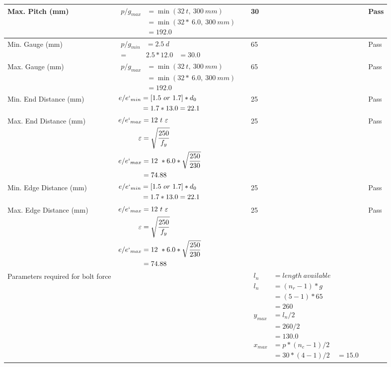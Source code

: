 \documentclass{article}%
\begin{document}
\begin{longtable}{|p{4cm}|p{5cm}|p{6.5cm}|p{1.5cm}|}
\hline%
Max. Pitch (mm)&$\begin{aligned}p/g_{max} &=\min(32~t,~300~mm)&\\ &=\min(32 *~6.0,~ 300 ~mm)\\&=192.0\end{aligned}$&30&Pass\\%
\hline%
Min. Gauge (mm)&$\begin{aligned}p/g_{min}&= 2.5 ~ d&\\ =&2.5*12.0&=30.0\end{aligned}$&65&Pass\\%
\hline%
Max. Gauge (mm)&$\begin{aligned}p/g_{max} &=\min(32~t,~300~mm)&\\ &=\min(32 *~6.0,~ 300 ~mm)\\&=192.0\end{aligned}$&65&Pass\\%
\hline%
Min. End Distance (mm)&$\begin{aligned}e/e`_{min} &=[1.5~or~ 1.7] * d_0\\ &=1.7*13.0=22.1 \end{aligned}$&25&Pass\\%
\hline%
Max. End Distance (mm)&$\begin{aligned}e/e`_{max} &= 12~ t~ \varepsilon&\\ \varepsilon &= \sqrt{\frac{250}{f_y}}\\ e/e`_{max}&=12 ~*6.0*\sqrt{\frac{250}{230}}\\ &=74.88\\ \end{aligned}$&25&Pass\\%
\hline%
Min. Edge Distance (mm)&$\begin{aligned}e/e`_{min} &=[1.5~or~ 1.7] * d_0\\ &=1.7*13.0=22.1 \end{aligned}$&25&Pass\\%
\hline%
Max. Edge Distance (mm)&$\begin{aligned}e/e`_{max} &= 12~ t~ \varepsilon&\\ \varepsilon &= \sqrt{\frac{250}{f_y}}\\ e/e`_{max}&=12 ~*6.0*\sqrt{\frac{250}{230}}\\ &=74.88\\ \end{aligned}$&25&Pass\\%
\hline%
Parameters required for bolt force&&$\begin{aligned} l_n~~~ &= length~available \\  l_n~~~ &= (n_r - 1) * g\\  &= (5 - 1) *65\\  & =260\\  y_{max} &= l_n / 2\\  &= 260 / 2 \\  & =130.0\\ x_{max} &= p * (n_c - 1) / 2 \\  &= 30 * (4 - 1) / 2 \  & =15.0\end{aligned}$&\\%

\end{longtable}
\end{document}
